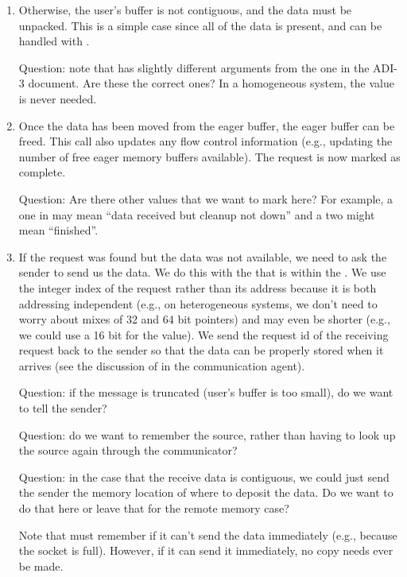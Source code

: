 \begin{enumerate}
\item Otherwise, the user's buffer is not contiguous, and the data must be
  unpacked.  This is a simple case since all of the data is present, and 
  can be handled with .

  Question: note that  has slightly different arguments
  from the one in the ADI-3 document.  Are these the correct ones?  In a
  homogeneous system, the  value is never needed.

\item Once the data has been moved from the eager buffer, the eager buffer 
 can be freed.  This call also updates any flow control information (e.g.,
 updating the number of free eager memory buffers available).  The request is
 now marked as complete.

  Question: Are there other values that we want to mark here?  For example, 
  a one in  may mean ``data received but cleanup not down'' and
  a two might mean ``finished''.

\item If the request was found but the data was not available, we need to ask
  the sender to send us the data.  We do this with the  that is
  within the .  We use the integer index of the
  request rather than its address because it is both addressing independent
  (e.g., on heterogeneous systems, we don't need to worry about mixes of 32
  and 64 bit pointers) and may even be shorter (e.g., we could use a 16 bit
   for the value).  We send the request id of the receiving
  request back to the sender so that the data can be properly stored when it
  arrives (see the discussion of  in the
  communication agent).

  Question: if the message is truncated (user's buffer is too small), do 
  we want to tell the sender?

  Question: do we want to remember the source, rather than having to look up
  the source again through the communicator?

  Question: in the case that the receive data is contiguous, we could just
  send the sender the memory location of where to deposit the data.  Do we
  want to do that here or leave that for the remote memory case?

  Note that  must remember  if it can't send
  the data immediately (e.g., because the socket is full).  However, if it can
  send it immediately, no copy needs ever be made.


\end{enumerate}
